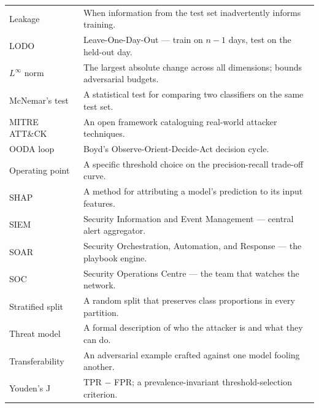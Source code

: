\begin{longtable}{p{4.0cm}p{11.0cm}}
    Leakage & When information from the test set inadvertently informs training. \\
    LODO & Leave-One-Day-Out --- train on $n - 1$ days, test on the held-out day. \\
    $L^\infty$ norm & The largest absolute change across all dimensions; bounds adversarial budgets. \\
    McNemar's test & A statistical test for comparing two classifiers on the same test set. \\
    MITRE ATT\&CK & An open framework cataloguing real-world attacker techniques. \\
    OODA loop & Boyd's Observe-Orient-Decide-Act decision cycle. \\
    Operating point & A specific threshold choice on the precision-recall trade-off curve. \\
    SHAP & A method for attributing a model's prediction to its input features. \\
    SIEM & Security Information and Event Management --- central alert aggregator. \\
    SOAR & Security Orchestration, Automation, and Response --- the playbook engine. \\
    SOC & Security Operations Centre --- the team that watches the network. \\
    Stratified split & A random split that preserves class proportions in every partition. \\
    Threat model & A formal description of who the attacker is and what they can do. \\
    Transferability & An adversarial example crafted against one model fooling another. \\
    Youden's J & TPR $-$ FPR; a prevalence-invariant threshold-selection criterion. \\
    \bottomrule
\end{longtable}

